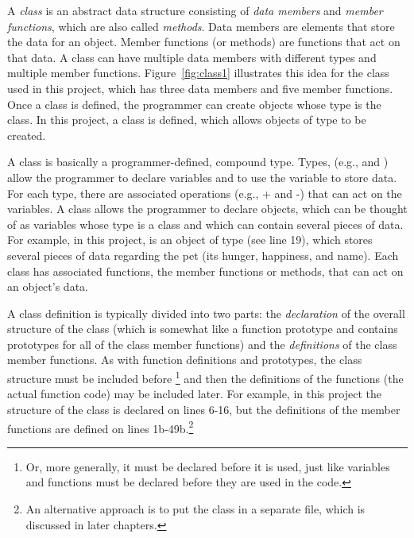  A \emph{class} is an abstract data structure consisting of \emph{data members} and \emph{member functions}, which are also called \emph{methods}.  Data members are elements that store the data for an object.  Member functions (or methods) are functions that act on that data.  A class can have multiple data members with different types and multiple member functions.  Figure~\ref{fig:class1} illustrates this idea for the  class used in this project, which has three data members and five member functions.  Once a class is defined, the programmer can create objects whose type is the class.  In this project, a  class is defined, which allows objects of type  to be created.

A class is basically a programmer-defined, compound type.  Types, (e.g.,  and ) allow the programmer to declare variables and to use the variable to store data.  For each type, there are associated operations (e.g., + and -) that can act on the variables.  
A class allows the programmer to declare objects, which can be thought of as variables whose type is a class and which can contain several pieces of data. For example, in this project,  is an object of type  (see line 19), which stores several pieces of data regarding the pet (its hunger, happiness, and name).  Each class has associated functions, the member functions or methods, that can act on an object's data.    

A class definition is typically divided into two parts: the \emph{declaration} of the overall structure of the class (which is somewhat like a function prototype and contains prototypes for all of the class member functions) and the \emph{definitions} of the class member functions.  As with function definitions and prototypes, the class structure must be included before \footnote{Or, more generally, it must be declared before it is used, just like variables and functions must be declared before they are used in the code.} and then the definitions of the functions (the actual function code) may be included later.  For example, in this project the structure of the  class is declared on lines 6-16, but the definitions of the member functions are defined on lines 1b-49b.\footnote{An alternative approach is to put the class in a separate file, which is discussed in later chapters.}

